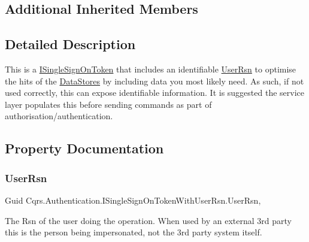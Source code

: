 \subsection*{Additional Inherited Members}


\subsection{Detailed Description}
This is a \hyperlink{interfaceCqrs_1_1Authentication_1_1ISingleSignOnToken}{I\+Single\+Sign\+On\+Token} that includes an identifiable \hyperlink{interfaceCqrs_1_1Authentication_1_1ISingleSignOnTokenWithUserRsn_a3ba8dbde50e032ebc76c96a5ff40f47f_a3ba8dbde50e032ebc76c96a5ff40f47f}{User\+Rsn} to optimise the hits of the \hyperlink{}{Data\+Stores} by including data you most likely need. As such, if not used correctly, this can expose identifiable information. It is suggested the service layer populates this before sending commands as part of authorisation/authentication. 



\subsection{Property Documentation}
\mbox{\label{interfaceCqrs_1_1Authentication_1_1ISingleSignOnTokenWithUserRsn_a3ba8dbde50e032ebc76c96a5ff40f47f_a3ba8dbde50e032ebc76c96a5ff40f47f}} 
\subsubsection{\texorpdfstring{User\+Rsn}{UserRsn}}
{\footnotesize\ttfamily Guid Cqrs.\+Authentication.\+I\+Single\+Sign\+On\+Token\+With\+User\+Rsn.\+User\+Rsn\hspace{0.3cm}{\ttfamily [get]}, {\ttfamily [set]}}



The Rsn of the user doing the operation. When used by an external 3rd party this is the person being impersonated, not the 3rd party system itself. 

